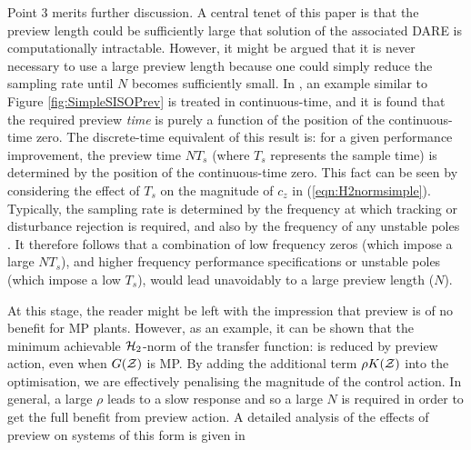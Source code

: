 Point 3 merits further discussion. A central tenet of this paper is that the preview length could be sufficiently large that solution of the associated {DARE} is computationally intractable. However, it might be argued that it is never necessary to use a large preview length because one could simply reduce the sampling rate until $N$ becomes sufficiently small.  In \cite{Middleteon_2004_PrevPerf}, an example similar to Figure \ref{fig:SimpleSISOPrev} is treated in continuous-time, and it is found that the required preview \textit{time} is purely a function of the position of the continuous-time zero. The discrete-time equivalent of this result is: for a given performance improvement, the preview time $NT_s$ (where $T_s$ represents the sample time) is determined by the position of the continuous-time zero. This fact can be seen by considering the effect of $T_s$ on the magnitude of $c_z$ in (\ref{eqn:H2normsimple}). Typically, the sampling rate is determined by the frequency at which tracking or disturbance rejection is required, and also by the frequency of any unstable poles \citep{Houpis_1991_DigitalControlSystems}. It therefore follows that a combination of low frequency zeros (which impose a large $NT_s$), and higher frequency performance specifications or unstable poles (which impose a low $T_s$), would lead unavoidably to a large preview length ($N$).%


At this stage, the reader might be left with the impression that preview is of no benefit for {MP} plants. However, as an example, it can be shown that the minimum achievable $\mathcal H_2$-norm of the transfer function:
is reduced by preview action, even when $G(\mathcal{Z})$ is {MP}. By adding the additional term $\rho K(\mathcal{Z})$ into the optimisation,
we are effectively penalising the magnitude of the control action. In general, a large $\rho$ leads to a slow response and so a large $N$ is required in order to get the full benefit from preview action. A detailed analysis of the effects of preview on systems of this form is given in \cite[Chapter 4]{Hazell_2007_Thesis}

